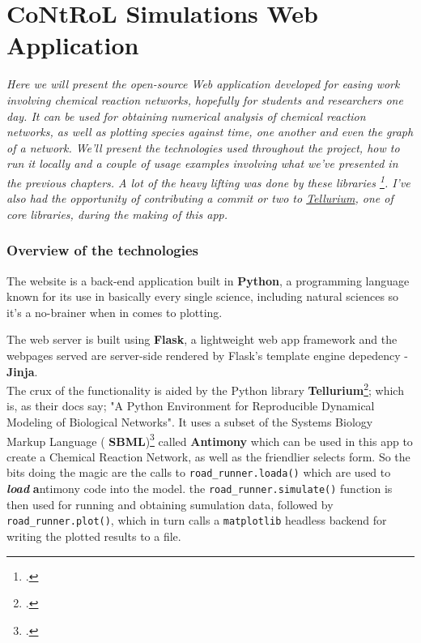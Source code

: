 \chapter{CoNtRoL Simulations Web Application}
\label{ch:web-app}

\textit{ Here we will present the open-source Web application developed for easing work involving chemical reaction networks, hopefully for students and researchers one day. It can be used for obtaining numerical analysis of chemical reaction networks, as well as plotting species against time, one another and even the graph of a network. We'll present the technologies used throughout the project, how to run it locally and a couple of usage examples involving what we've presented in the previous chapters. A lot of the heavy lifting was done by these libraries \footcite{10.1093/bioinformatics/btac730, xu2023SbmlDiagrams, medley2018tellurium, choi2018Tellurium}. I've also had the opportunity of contributing a commit or two to \href{https://github.com/sys-bio/tellurium}{Tellurium}, one of core libraries, during the making of this app.}

\subsection{Overview of the technologies}
The website is a back-end application built in \textbf{Python}, a programming language known for its use in basically every single science, including natural sciences so it's a no-brainer when in comes to plotting.

The web server is built using \textbf{Flask}, a lightweight web app framework and the webpages served are server-side rendered by Flask's template engine depedency - \textbf{Jinja}.
\\
The crux of the functionality is aided by the Python library \textbf{Tellurium}\footcite{choi2018Tellurium,medley2018tellurium}; which is, as their docs say; "A Python Environment for Reproducible Dynamical Modeling of Biological Networks". It uses a subset of the Systems Biology Markup Language ( \textbf{SBML})\footcite{xu2023SbmlDiagrams,bornstein2008Libsbml, 10.1093/bioinformatics/btac730} called \textbf{Antimony} which can be used in this app to create a Chemical Reaction Network, as well as the friendlier selects form. So the bits doing the magic are the calls to \verb|road_runner.loada()| which are used to \textbf{\textit{load}}    \textbf{a}ntimony code into the model.
the \verb|road_runner.simulate()| function is then used for running and obtaining sumulation data, followed by \verb|road_runner.plot()|, which in turn calls a \verb|matplotlib| headless backend for writing the plotted results to a file.

